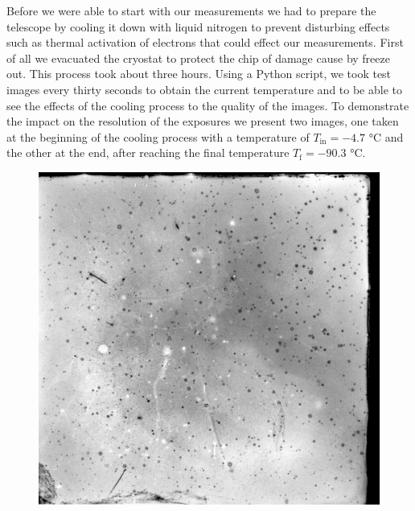 Before we were able to start with our measurements we had to prepare the telescope by cooling it down with liquid nitrogen to prevent disturbing effects such as thermal activation of electrons that could effect our measurements. First of all we evacuated the cryostat to protect the chip of damage cause by freeze out. This process took about three hours. Using a Python script, we took test images every thirty seconds to obtain the current temperature and to be able to see the effects of the cooling process to the quality of the images. To demonstrate the impact on the resolution of the exposures we present two images, one taken at the beginning of the cooling process with a temperature of $T_{\text{in}} = -4.7$ °C  and the other at the end, after reaching the final temperature $T_{\text{f}} = -90.3$ °C.
\begin{figure}[H]
	\begin{minipage}{0.4\textwidth}
	\hspace{0.6cm}
		\includegraphics[scale = 0.17]{figures/Exposures/cooling_start}
	\end{minipage}
	\begin{minipage}{0.4\textwidth}
	\hspace{1.5cm}

\end{minipage}
\end{figure}
